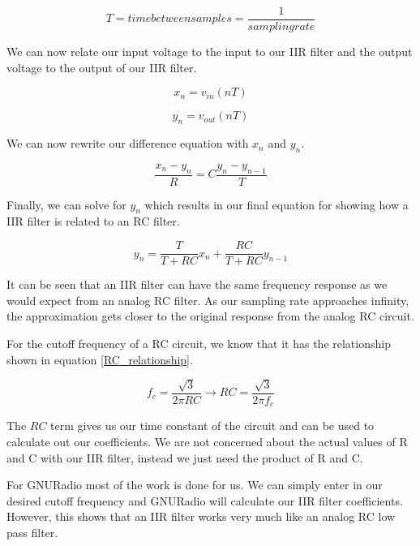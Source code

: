 \begin{equation}\label{sampling_rate_eq}
T=time between samples=\frac{1}{sampling rate}
\end{equation}

We can now relate our input voltage to the input to our IIR filter and the output voltage to the output of our IIR filter.

\begin{equation}\label{input_IIR}
x_n=v_{in}(nT)
\end{equation}

\begin{equation}\label{output_IIR}
y_n=v_{out}(nT)
\end{equation}

We can now rewrite our difference equation with $x_n$ and $y_n$.

\begin{equation}\label{diff_xn_yn}
\frac{x_n-y_n}{R}=C\frac{y_n-y_{n-1}}{T}
\end{equation}

Finally, we can solve for $y_n$ which results in our final equation for showing how a IIR filter is related to an RC filter.

\begin{equation}\label{final_IIR_RC}
y_n=\frac{T}{T+RC}x_n+\frac{RC}{T+RC}y_{n-1}
\end{equation}

It can be seen that an IIR filter can have the same frequency response as we would expect from an analog RC filter.  As our sampling rate approaches infinity, the approximation gets closer to the original response from the analog RC circuit.  

For the cutoff frequency of a RC circuit, we know that it has the relationship shown in equation \ref{RC_relationship}.

\begin{equation}\label{RC_relationship}
f_c=\frac{\sqrt{3}}{2\pi RC}\rightarrow RC=\frac{\sqrt{3}}{2\pi f_c}
\end{equation}

The $RC$ term gives us our time constant of the circuit and can be used to calculate out our coefficients.  We are not concerned about the actual values of R and C with our IIR filter, instead we just need the product of R and C.  

For GNURadio most of the work is done for us.  We can simply enter in our desired cutoff frequency and GNURadio will calculate our IIR filter coefficients.  However, this shows that an IIR filter works very much like an analog RC low pass filter.

